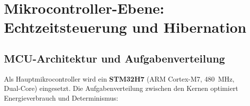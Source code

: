 ﻿\documentclass[a4paper,12pt]{scrreprt}
\theoremstyle{definition}
\begin{document}
\section{Mikrocontroller-Ebene: Echtzeitsteuerung und Hibernation}

\subsection{MCU-Architektur und Aufgabenverteilung}

Als Hauptmikrocontroller wird ein \textbf{STM32H7} (ARM Cortex-M7,
\SI{480}{\mega\hertz}, Dual-Core) eingesetzt. Die Aufgabenverteilung
zwischen den Kernen optimiert Energieverbrauch und Determinismus:
\end{document}
